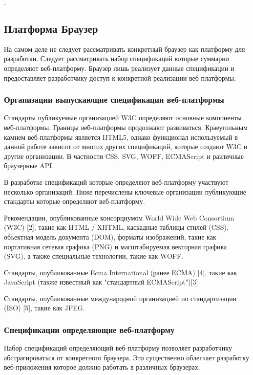 .


\newpage

\subsection{Платформа Браузер}
На самом деле не следует рассматривать конкретный браузер как платформу для разработки. Следует рассматривать набор спецификаций которые суммарно определяют веб-платформу. Браузер лишь реализует данные спецификации и предоставляет разработчику доступ к конкретной реализации веб-платформы.

\subsubsection{ Организации выпускающие спецификации веб-платформы}
Стандарты публикуемые организацией W3C определяют основные компоненты веб-платформы. Границы веб-платформы продолжают развиваться. Краеугольным камнем веб-платформы является HTML5, однако функционал используемый в данной работе зависит от многих других спецификаций, которые создают W3C и другие организации. В частности CSS, SVG, WOFF, ECMAScript и различные браузерные API.

В разработке спецификаций которые определяют веб-платформу участвуют несколько организаций. Ниже перечислены ключевые организации публикующие стандарты которые определяют веб-платформу.

\begin{my_enumerate}
\item Рекомендации, опубликованные консорциумом World Wide Web Consortium (W3C) [2], такие как HTML / XHTML, каскадные таблицы стилей (CSS), объектная модель документа (DOM), форматы изображений, такие как портативная сетевая графика (PNG) и масштабируемая векторная графика (SVG), а также специальные технологии, такие как WOFF.
\item Стандарты, опубликованные Ecma International (ранее ECMA) [4], такие как JavaScript (также известный как "стандартный ECMAScript")[3]
\item Стандарты, опубликованные международной организацией по стандартизации (ISO) [5], такие как JPEG.
\end{my_enumerate}


\subsubsection{ Спецификации определяющие веб-платформу}
Набор спецификаций определяющий веб-платформу позволяет разработчику абстрагироваться от конкретного браузера. Это существенно облегчает разработку веб-приложения которое должно работать в различных браузерах.

